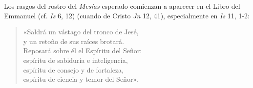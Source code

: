  Los rasgos del rostro del \emph{Mesías} esperado comienzan a aparecer en el Libro del Emmanuel (cf. \emph{Is} 6, 12) (cuando  de Cristo \emph{Jn} 12, 41), especialmente en \emph{Is} 11, 1-2:
	
\begin{quote}
	«Saldrá un vástago del tronco de Jesé, \\y un retoño de sus raíces brotará. \\Reposará sobre él el Espíritu del Señor: \\espíritu de sabiduría e inteligencia, \\espíritu de consejo y de fortaleza, \\espíritu de ciencia y temor del Señor».
\end{quote}